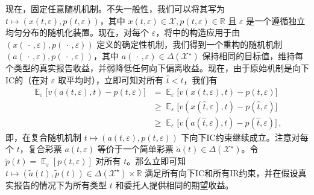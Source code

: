 \documentclass[12pt,letterpaper]{article}
\newenvironment{translation}{\color{blue}\noindent}{}
\theoremstyle{plain}
\theoremstyle{definition}
\theoremstyle{remark}
\DeclareMathOperator{\E}{\mathds{E}}
\newcommand{\R}{\mathds{R}}
\renewcommand{\1}{\mathds{1}}
\newcommand{\X}{\mathcal{X}}
\theoremstyle{definition}
\begin{document}
\begin{translation}
现在，固定任意随机机制。不失一般性，我们可以将其写为 $t \mapsto (x(t, \varepsilon), p(t, \varepsilon))$，其中 $x(t, \varepsilon) \in \mathcal{X}, p(t, \varepsilon) \in \R$ 且 $\varepsilon$ 是一个遵循独立均匀分布的随机化装置。现在，对每个 $\varepsilon$，将中的构造应用于由 $(x(\,\cdot\,, \varepsilon), p(\,\cdot\,, \varepsilon))$ 定义的确定性机制，我们得到一个重构的随机机制 $(a(\,\cdot\,, \varepsilon), p(\,\cdot\,, \varepsilon))$，其中 $a(\,\cdot\,, \varepsilon) \in \Delta(\X^\star)$ 保持相同的目标值，维持每个类型的真实报告收益，并弱降低任何向下偏离收益。现在，由于原始机制是向下IC的（在对 $\varepsilon$ 取平均时），立即可知对所有 $\hat{t} < t$，我们有
\begin{align*}
    \E_{\varepsilon}\Big[v(a(t, \varepsilon), t) - p(t, \varepsilon)\Big] &= \E_{\varepsilon}\Big[v(x(t, \varepsilon), t) - p(t, \varepsilon)\Big]  \\
    &\geq \E_{\varepsilon}\Big[v(x(\hat{t}, \varepsilon), t) - p(\hat{t}, \varepsilon)\Big]   \\
    &\geq \E_{\varepsilon}\Big[v(a(\hat{t}, \varepsilon), t) - p(\hat{t}, \varepsilon)\Big]\,,
\end{align*}
即，在复合随机机制 $t \mapsto (a(t, \varepsilon), p(t, \varepsilon))$ 下向下IC约束继续成立。注意对每个 $t$，复合彩票 $a(t, \varepsilon)$ 等价于一个简单彩票 $\tilde{a}(t) \in \Delta(\X^\star)$。令 $\tilde{p}(t) = \E_\varepsilon[p(t, \varepsilon)]$ 对所有 $t$。那么立即可知 $t \mapsto (\tilde{a}(t), \tilde{p}(t)) \in \Delta(\X^\star) \times \R$ 满足所有向下IC和所有IR约束，并在假设真实报告的情况下为所有类型 $t$ 和委托人提供相同的期望收益。
\end{translation}
\end{document}
